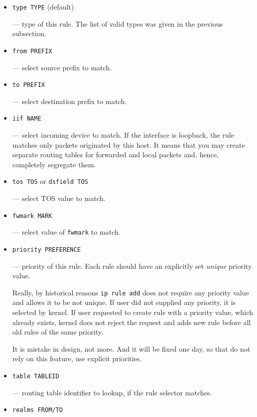 \begin{itemize}
\item \verb|type TYPE| (default)

--- type of this rule. The list of valid types was given in the previous
subsection.

\item \verb|from PREFIX|

--- select source prefix to match.

\item \verb|to PREFIX|

--- select destination prefix to match.

\item \verb|iif NAME|

--- select incoming device to match. If the interface is loopback,
the rule matches only packets originated by this host. It means that you
may create separate routing tables for forwarded and local packets and,
hence, completely segregate them.

\item \verb|tos TOS| or \verb|dsfield TOS|

--- select TOS value to match.

\item \verb|fwmark MARK|

--- select value of \verb|fwmark| to match.

\item \verb|priority PREFERENCE|

--- priority of this rule. Each rule should have an explicitly
set {\em unique\/} priority value.
\begin{NB}
  Really, by historical reasons \verb|ip rule add| does not require any
  priority value and allows it to be not unique.
  If user did not supplied any priority, it is selected by kernel.
  If user requested to create rule with a priority value, which
  already exists, kernel does not reject the request and adds
  new rule before all old rules of the same priority.

  It is mistake in design, not more. And it will be fixed one day,
  so that do not rely on this feature, use explicit priorities.
\end{NB}


\item \verb|table TABLEID|

--- routing table identifier to lookup, if the rule selector matches.

\item \verb|realms FROM/TO|


\end{itemize}
